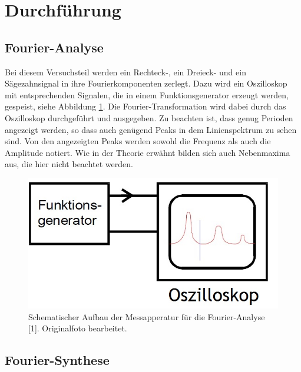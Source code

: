 \section{Durchführung}
\label{sec:Durchführung}

\subsection{Fourier-Analyse}

Bei diesem Versuchsteil werden ein Rechteck-, ein Dreieck- und 
ein Sägezahnsignal in ihre Fourierkomponenten zerlegt. Dazu wird
ein Oszilloskop mit entsprechenden Signalen, die in einem Funktionsgenerator 
erzeugt werden, gespeist, siehe Abbildung \ref{fig:aufbau}. 
Die Fourier-Transformation wird dabei durch das
Oszilloskop durchgeführt und ausgegeben. Zu beachten ist, dass genug
Perioden angezeigt werden, so dass auch genügend Peaks in dem 
Linienspektrum zu sehen sind. Von den angezeigten Peaks werden sowohl
die Frequenz als auch die Amplitude notiert. Wie in der Theorie erwähnt
bilden sich auch Nebenmaxima aus, die hier nicht beachtet werden. 

\begin{figure}
  \centering
  \includegraphics[scale=0.5]{content/Aufbau_1.jpg}
  \caption{Schematischer Aufbau der Messapperatur für die Fourier-Analyse [1]. Originalfoto bearbeitet.}
  \label{fig:aufbau}
\end{figure}

\subsection{Fourier-Synthese}

